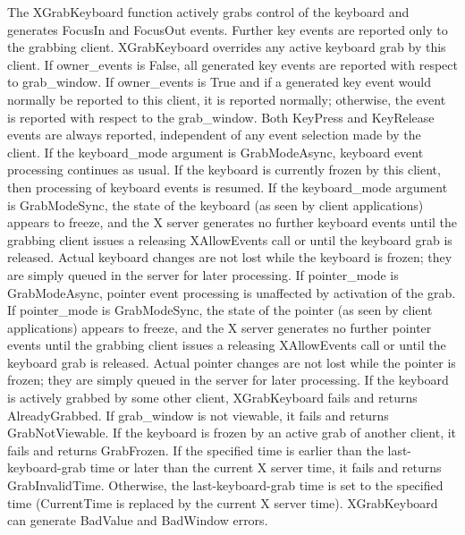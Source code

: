 \documentclass{report}
\begin{document}
\begin{itemize}
\begin{itemize}
            \end{itemize}
            The XGrabKeyboard function actively grabs control of the keyboard and generates FocusIn and FocusOut events. Further key events are reported only to the grabbing client. XGrabKeyboard overrides any active keyboard grab by this client. If owner\_events is False, all generated key events are reported with respect to grab\_window. If owner\_events is True and if a generated key event would normally be reported to this client, it is reported normally; otherwise, the event is reported with respect to the grab\_window. Both KeyPress and KeyRelease events are always reported, independent of any event selection made by the client.
            \bigbreak \noindent 
            If the keyboard\_mode argument is GrabModeAsync, keyboard event processing continues as usual. If the keyboard is currently frozen by this client, then processing of keyboard events is resumed. If the keyboard\_mode argument is GrabModeSync, the state of the keyboard (as seen by client applications) appears to freeze, and the X server generates no further keyboard events until the grabbing client issues a releasing XAllowEvents call or until the keyboard grab is released. Actual keyboard changes are not lost while the keyboard is frozen; they are simply queued in the server for later processing.
            \bigbreak \noindent 
            If pointer\_mode is GrabModeAsync, pointer event processing is unaffected by activation of the grab. If pointer\_mode is GrabModeSync, the state of the pointer (as seen by client applications) appears to freeze, and the X server generates no further pointer events until the grabbing client issues a releasing XAllowEvents call or until the keyboard grab is released. Actual pointer changes are not lost while the pointer is frozen; they are simply queued in the server for later processing.
            \bigbreak \noindent 
            If the keyboard is actively grabbed by some other client, XGrabKeyboard fails and returns AlreadyGrabbed. If grab\_window is not viewable, it fails and returns GrabNotViewable. If the keyboard is frozen by an active grab of another client, it fails and returns GrabFrozen. If the specified time is earlier than the last-keyboard-grab time or later than the current X server time, it fails and returns GrabInvalidTime. Otherwise, the last-keyboard-grab time is set to the specified time (CurrentTime is replaced by the current X server time).
            \bigbreak \noindent 
            XGrabKeyboard can generate BadValue and BadWindow errors.
            \bigbreak \noindent 

\end{itemize}
\end{document}
